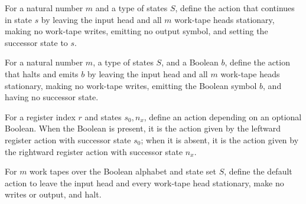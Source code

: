 \begin{definition}
\label{Complexity.LogProg.goAct}
\leanok
{}
For a natural number $m$ and a type of states $S$, define the action that continues in
state $s$ by leaving the input head and all $m$ work-tape heads stationary, making no
work-tape writes, emitting no output symbol, and setting the successor state to $s$.
\end{definition}

\begin{definition}
\label{Complexity.LogProg.retAct}
\leanok
{}
For a natural number $m$, a type of states $S$, and a Boolean $b$, define the action
that halts and emits $b$ by leaving the input head and all $m$ work-tape heads
stationary, making no work-tape writes, emitting the Boolean symbol $b$, and having no
successor state.
\end{definition}

\begin{definition}
\label{Complexity.LogProg.rw2Act}
\leanok
{}
For a register index $r$ and states $s_0,n_x$, define an action depending on an optional
Boolean. When the Boolean is present, it is the action given by the leftward register
action with successor state $s_0$; when it is absent, it is the action given by the
rightward register action with successor state $n_x$.
\end{definition}

\begin{definition}
\label{Complexity.LogProg.junkAct}
\leanok
{}
For $m$ work tapes over the Boolean alphabet and state set $S$, define the default
action to leave the input head and every work-tape head stationary, make no writes or
output, and halt.
\end{definition}

